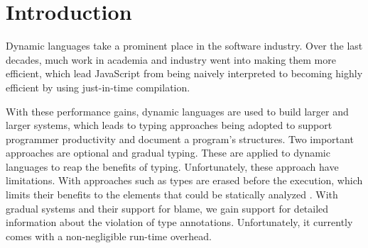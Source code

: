 
\section{Introduction}
\label{sec:introduction}

%
%

Dynamic languages take a prominent place in the software industry.
Over the last decades, much work in academia and industry
went into making them more efficient\citep{Self,Bolz2013,Bolz:2013:IMT,Wurthinger:2017:PPE,Daloze2016,Clifford:2015:MM,Degenbaev:2016:ITG},
which lead JavaScript from being naively interpreted
to becoming highly efficient by using just-in-time compilation.



With these performance gains,
dynamic languages are used to build larger and larger systems,
which leads to typing approaches being adopted
to support programmer productivity and document a program's structures.
Two important approaches are optional\citep{Bracha:04:PT}
and gradual typing\citep{Siek2006,Siek2015}.
These are applied to dynamic languages to reap the benefits of typing.
Unfortunately, these approach have limitations.
With approaches such as 
types are erased before the execution,
which limits their benefits to the elements that could be statically analyzed
.
With gradual systems and their support for blame,
we gain support for detailed information
about the violation of type annotations.
Unfortunately, it currently comes with a non-negligible run-time overhead\citep{Takikawa2016,Vitousek2017,Muehlboeck2017,Bauman2017,Richards2017,Stulova2016,Greenman2018}.

